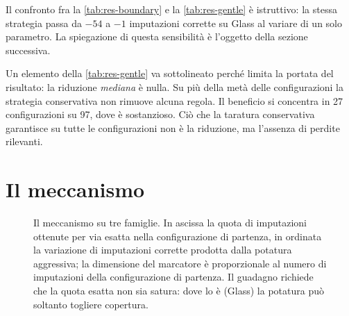Il confronto fra la \autoref{tab:res-boundary} e la \autoref{tab:res-gentle} è istruttivo: la
stessa strategia passa da $-54$ a $-1$ imputazioni corrette su Glass al variare di un solo
parametro. La spiegazione di questa sensibilità è l'oggetto della sezione successiva.

Un elemento della \autoref{tab:res-gentle} va sottolineato perché limita la portata del
risultato: la riduzione \emph{mediana} è nulla. Su più della metà delle configurazioni la
strategia conservativa non rimuove alcuna regola. Il beneficio si concentra in \num{27}
configurazioni su \num{97}, dove è sostanzioso. Ciò che la taratura conservativa garantisce su
tutte le configurazioni non è la riduzione, ma l'assenza di perdite rilevanti.

\section{Il meccanismo}\label{sec:mechanism}

\begin{figure}[htbp]
\centering
{}
\caption{Il meccanismo su tre famiglie. In ascissa la quota di imputazioni ottenute per via esatta
nella configurazione di partenza, in ordinata la variazione di imputazioni corrette prodotta dalla
potatura aggressiva; la dimensione del marcatore è proporzionale al numero di imputazioni della
configurazione di partenza. Il guadagno richiede che la quota esatta non sia satura: dove lo è
(Glass) la potatura può soltanto togliere copertura.}
\label{fig:mechanism}
\end{figure}

